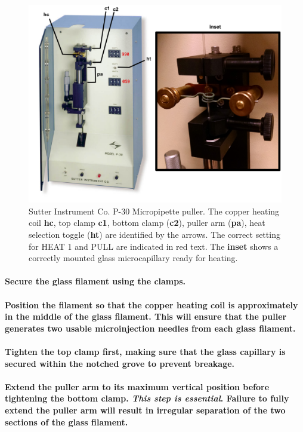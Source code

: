 \documentclass[11pt]{article}
\begin{document}
\begin{figure}
\centering
\includegraphics[width=0.6\linewidth]{./img/figure2.pdf}
\caption{Sutter Instrument Co. P-30 Micropipette puller. The copper heating coil \textbf{hc}, top clamp \textbf{c1}, bottom clamp (\textbf{c2}), puller arm (\textbf{pa}), heat selection toggle (\textbf{ht}) are identified by the arrows. The correct setting for HEAT 1 and PULL are indicated in red text. The \textbf{inset} shows a correctly mounted glass microcapillary ready for heating.}
\end{figure}

\paragraph{{\sffamily } Secure the glass filament using the clamps.}
\label{sec:orgheadline22}
\paragraph{{\sffamily } Position the filament so that the copper heating coil is approximately in the middle of the glass filament. This will ensure that the puller generates two usable microinjection needles from each glass filament.}
\label{sec:orgheadline23}
\paragraph{{\sffamily } Tighten the top clamp first, making sure that the glass capillary is secured within the notched grove to prevent breakage.}
\label{sec:orgheadline24}
\paragraph{{\sffamily } Extend the puller arm to its maximum vertical position before tightening the bottom clamp. \textbf{\emph{This step is essential}}. Failure to fully extend the puller arm will result in irregular separation of the two sections of the glass filament.}
\label{sec:orgheadline25}
\end{document}
